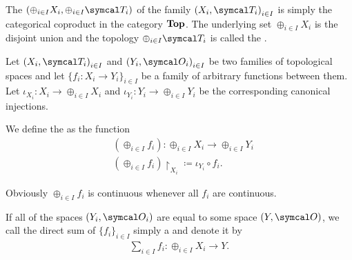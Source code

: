 \begin{definition}\label{def:topological_sum}\cite[74]{Engelking1989}
  The  \( (\oplus_{i \in I} X_i, \oplus_{i \in I} \Cal{T}_i) \) of the family \( { (X_i, \Cal{T}_i) }_{i \in I} \) is simply the categorical coproduct in the category \( \operatorname{\mathbf{Top}} \). The underlying set \( \oplus_{i \in I} X_i \) is the disjoint union and the topology \( \oplus_{i \in I} \Cal{T}_i \) is called the .

  Let \( { (X_i, \Cal{T}_i) }_{i \in I} \) and \( { (Y_i, \Cal{O}_i) }_{i \in I} \) be two families of topological spaces and let \( \{ f_i: X_i \to Y_i \}_{i \in I} \) be a family of arbitrary functions between them. Let \( \iota_{X_i}: X_i \to \oplus_{i \in I} X_i \) and \( \iota_{Y_i}: Y_i \to \oplus_{i \in I} Y_i \) be the corresponding canonical injections.

  We define the  as the function
  \begin{align*}
    &(\oplus_{i \in I} f_i): \oplus_{i \in I} X_i \to \oplus_{i \in I} Y_i \\
    &(\oplus_{i \in I} f_i){\restriction}_{X_i} \coloneqq \iota_{Y_i} \circ f_i.
  \end{align*}

  Obviously \( \oplus_{i \in I} f_i \) is continuous whenever all \( f_i \) are continuous.

  If all of the spaces \( (Y_i, \Cal{O}_i) \) are equal to some space \( (Y, \Cal{O}) \), we call the direct sum of \( \{ f_i \}_{i \in I} \) simply a  and denote it by
  \begin{align*}
    \sum_{i \in I} f_i: \oplus_{i \in I} X_i \to Y.
  \end{align*}
\end{definition}
